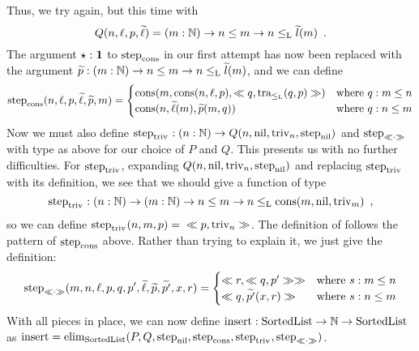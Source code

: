 \documentclass{article}
\begin{document}
\begin{example}
Thus, we try again, but this time with 
\[
Q(n, \ell, p,\stepindarg{\ell})
   = (m : \Nat) \to n \leq m \to n \lessList \stepindarg{l}(m) \enspace .
\]
The argument $\oneelt : \one$ to $\stepind{\consListbare}$ in our
first attempt has now been replaced with the argument $\stepindarg{p}
: (m : \Nat) \to n \leq m \to n \lessList \stepindarg{l}(m)$, and we can define
\[
\stepind{\consListbare}(n, \ell, p, \stepindarg{\ell}, \stepindarg{p}, m) =
\begin{cases}
  \consList{m}{\consList{n}{\ell}{p}}{\consLess{m}{n}{\ell}{p}{q}{\lessListtrans{q}{p}}} & \text{where $q : m \leq n$} \\
  \consList{n}{\stepindarg{\ell}(m)}{\stepindarg{p}(m, q)} & \text{where $q : n \leq m$} 
\end{cases}
\]
%
Now we must also define $\stepind{\nilLess{}} : (n : \Nat) \to Q(n,
\nilList, \nilLess{n}, \stepind{\nilList})$ and
$\stepind{\consLessbare}$ with type as above for our choice of $P$ and
$Q$. This presents us with no further difficulties. For
$\stepind{\nilLess{}}$, expanding $Q(n, \nilList, \nilLess{n},
\stepind{\nilList})$ and replacing $\stepind{\nilLess{}}$ with its
definition, we see that we should give a function of type
\[
\stepind{\nilLess{}} : (n : \Nat) \to (m : \Nat) \to n \leq m \to n
\lessList \consList{m}{\nilList}{\nilLess{m}} \enspace ,
\]
so we can define $\stepind{\nilLess{}}(n, m, p) = {}
\consLess{n}{m}{\nilList}{\nilLess{m}}{p}{\nilLess{n}}$. The
definition of follows the pattern of $\stepind{\consListbare}$
above. Rather than trying to explain it, we just give the definition:
\[
\stepind{\consLessbare}(m, n, \ell, p, q, p', \stepindarg{\ell}, \stepindarg{p}, \stepindarg{p'}, x, r) =
\begin{cases}
  \consLess{m}{x}{\consList{n}{\ell}{p}}{\consLess{m}{n}{\ell}{p}{s}{\lessListtrans{s}{p}}}{r}{\consLess{m}{n}{\ell}{p}{q}{p'}} & \text{where $s : m \leq n$} \\
  \consLess{m}{n}{p'}{\stepindarg{p}(x, s)}{q}{\stepindarg{p'}(x, r)} & \text{where $s : n \leq m$} 
\end{cases}
\]
%
With all pieces in place, we can now define $\Listinsert : \SortedList
\to \Nat \to \SortedList$ as $\Listinsert = \elim_{\SortedList}(P, Q,
\stepind{\nilList}, \stepind{\consListbare}, \stepind{\nilLess{}},
\stepind{\consLessbare})$.
\blackqed




\end{example}
\end{document}
